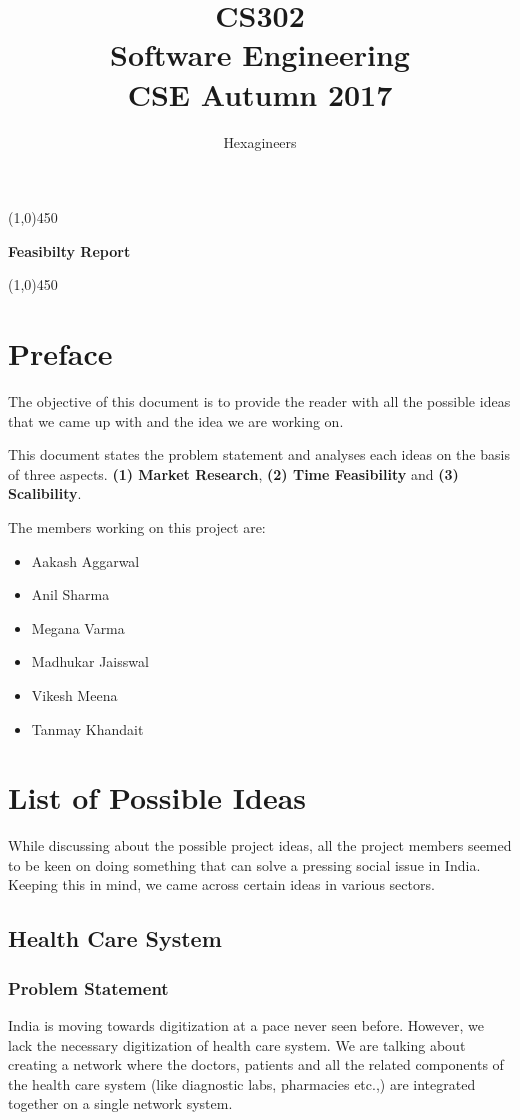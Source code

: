 \documentclass{article}
\title{\textbf{CS302}\\\HUGE Software Engineering\\
\LARGE CSE\hspace{\labelsep}\textbullet\hspace{\labelsep} Autumn 2017
}
\author{Hexagineers}
\begin{document}
\maketitle
\line(1,0){450}

\begin{center}
\textbf{\Huge Feasibilty Report}
\end{center}
\line(1,0){450}
\newpage

\tableofcontents
\newpage

\section{Preface}
\par The objective of this document is to provide the reader with all the possible ideas that we came up with and the idea we are working on.

\par This document states the problem statement and analyses each ideas on the basis of three aspects. \textbf{(1) Market Research}, \textbf{(2) Time Feasibility} and \textbf{(3) Scalibility}. 
\par The members working on this project are:
\begin{itemize}
    \item Aakash Aggarwal
    \item Anil Sharma
    \item Megana Varma
    \item Madhukar Jaisswal
    \item Vikesh Meena
    \item Tanmay Khandait
\end{itemize}
\newpage
\section{List of Possible Ideas}
\par While discussing about the possible project ideas, all the project members seemed to be keen on doing something that can solve a pressing social issue in India. Keeping this in mind, we came across certain ideas in various sectors.
\subsection{Health Care System}
\subsubsection{Problem Statement}
\par India is moving towards digitization at a pace never seen before. However, we lack the necessary digitization of health care system. 
We are talking about creating a network where the doctors, patients and all the related components of the health care system (like diagnostic labs, pharmacies etc.,) are integrated together on a single network system.
\end{document}
